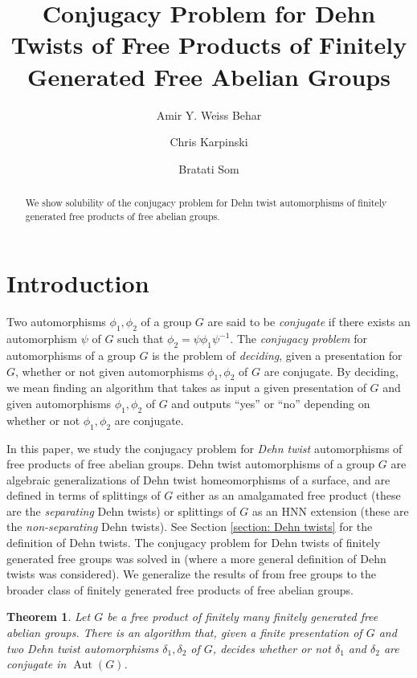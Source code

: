 \documentclass{amsart}
\title[Conjugacy Problem for Dehn Twists of Free Products of Free Abelian Groups]{Conjugacy Problem for Dehn Twists of Free Products of Finitely Generated Free Abelian Groups}
\author{Amir Y. Weiss Behar \and Chris Karpinski \and Bratati Som}
\DeclareMathOperator{\Aut}{Aut}
\theoremstyle{plain}
\newtheorem{thm}{Theorem}[section]
\theoremstyle{definition}
\theoremstyle{remark}
\begin{document}
\maketitle
\begin{abstract}
     We show solubility of the conjugacy problem for Dehn twist automorphisms of finitely generated free products of free abelian groups.
\end{abstract}

\section{Introduction}

Two automorphisms $\phi_1, \phi_2$ of a group $G$ are said to be \emph{conjugate} if there exists an automorphism $\psi$ of $G$ such that $\phi_2 = \psi \phi_1 \psi^{-1}$. The \emph{conjugacy problem} for automorphisms of a group $G$ is the problem of \emph{deciding}, given a presentation for $G$, whether or not given automorphisms $\phi_1, \phi_2$ of $G$ are conjugate. By deciding, we mean finding an algorithm that takes as input a given presentation of $G$ and given automorphisms $\phi_1, \phi_2$ of $G$ and outputs ``yes'' or ``no'' depending on whether or not $\phi_1, \phi_2$ are conjugate. 

In this paper, we study the conjugacy problem for \emph{Dehn twist} automorphisms of free products of free abelian groups. Dehn twist automorphisms of a group $G$ are algebraic generalizations of Dehn twist homeomorphisms of a surface, and are defined in terms of splittings of $G$ either as an amalgamated free product (these are the \emph{separating} Dehn twists) or splittings of $G$ as an HNN extension (these are the \emph{non-separating} Dehn twists). See Section \ref{section: Dehn twists} for the definition of Dehn twists. The conjugacy problem for Dehn twists of finitely generated free groups was solved in \cite{Cohen_Lustig} (where a more general definition of Dehn twists was considered). We generalize the results of \cite{Cohen_Lustig} from free groups to the broader class of finitely generated free products of free abelian groups. 

\begin{thm}
    \label{thm: main theorem}
    Let $G$ be a free product of finitely many finitely generated free abelian groups. There is an algorithm that, given a finite presentation of $G$ and two Dehn twist automorphisms $\delta_1, \delta_2$ of $G$, decides whether or not $\delta_1$ and $\delta_2$ are conjugate in $\Aut(G)$. 
\end{thm}
\end{document}
